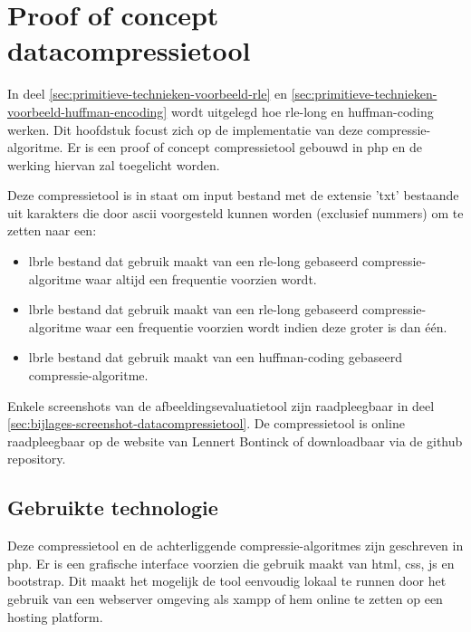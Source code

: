 \chapter{Proof of concept datacompressietool}
\label{ch:compressietool}

In deel \ref{sec:primitieve-technieken-voorbeeld-rle} en \ref{sec:primitieve-technieken-voorbeeld-huffman-encoding} wordt uitgelegd hoe \gls{rle-long} en \gls{huffman-coding} werken. Dit hoofdstuk focust zich op de implementatie van deze \gls{compressie-algoritme}. Er is een proof of concept \gls{compressietool} gebouwd in \gls{php} en de werking hiervan zal toegelicht worden. 

Deze \gls{compressietool} is in staat om input bestand met de \gls{extensie} 'txt' bestaande uit karakters die door \gls{ascii} voorgesteld kunnen worden (exclusief nummers) om te zetten naar een:

\begin{itemize}
	\item \Gls{lbrle} bestand dat gebruik maakt van een \gls{rle-long} gebaseerd \gls{compressie-algoritme} waar altijd een frequentie voorzien wordt.
	
	\item \Gls{lbrle} bestand dat gebruik maakt van een \gls{rle-long} gebaseerd \gls{compressie-algoritme} waar een frequentie voorzien wordt indien deze groter is dan één.
	
	\item \Gls{lbrle} bestand dat gebruik maakt van een \gls{huffman-coding} gebaseerd \gls{compressie-algoritme}.
\end{itemize}

Enkele screenshots van de \gls{afbeeldingsevaluatietool} zijn raadpleegbaar in deel \ref{sec:bijlages-screenshot-datacompressietool}. De \gls{compressietool} is online raadpleegbaar op de website van Lennert Bontinck of downloadbaar via de \gls{github} repository.
 
\section{Gebruikte technologie}
\label{sec:compressietool-gebruikte-technologie}

Deze \gls{compressietool} en de achterliggende \glspl{compressie-algoritme} zijn geschreven in \gls{php}. Er is een grafische interface voorzien die gebruik maakt van \gls{html}, \gls{css}, \gls{js} en \gls{bootstrap}. Dit maakt het mogelijk de tool eenvoudig lokaal te runnen door het gebruik van een webserver omgeving als \gls{xampp} of hem online te zetten op een \gls{hosting} platform.


